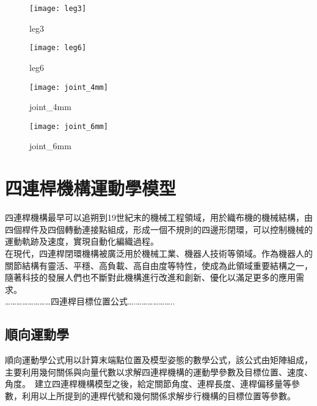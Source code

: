 \begin{figure}[htbp]
  \begin{minipage}[t]{0.45\linewidth}
    \centering
    \texttt{[image: leg3]}
    \caption{leg3}
    \label{leg3}
  \end{minipage}
  \hfill
  \begin{minipage}[t]{0.45\linewidth}
    \centering
    \texttt{[image: leg6]}
    \caption{leg6}
    \label{leg6}
  \end{minipage}
\end{figure}

\begin{figure}[htbp]
  \begin{minipage}[t]{0.45\linewidth}
    \centering
    \texttt{[image: joint\_4mm]}
    \caption{joint_4mm}
    \label{joint_4mm}
  \end{minipage}
  \hfill
  \begin{minipage}[t]{0.45\linewidth}
    \centering
    \texttt{[image: joint\_6mm]}
    \caption{joint_6mm}
    \label{joint_6mm}
  \end{minipage}
\end{figure}
\newpage

\section{四連桿機構運動學模型}

四連桿機構最早可以追朔到19世紀末的機械工程領域，用於織布機的機械結構，由四個桿件及四個轉動連接點組成，形成一個不規則的四邊形閉環，可以控制機械的運動軌跡及速度，實現自動化編織過程。\\
在現代，四連桿閉環機構被廣泛用於機械工業、機器人技術等領域。作為機器人的關節結構有靈活、平穩、高負載、高自由度等特性，使成為此領域重要結構之一，隨著科技的發展人們也不斷對此機構進行改進和創新、優化以滿足更多的應用需求。\\

……………………四連桿目標位置公式….………………..

\subsection{順向運動學}
順向運動學公式用以計算末端點位置及模型姿態的數學公式，該公式由矩陣組成，主要利用幾何關係與向量代數以求解四連桿機構的運動學參數及目標位置、速度、角度。\
建立四連桿機構模型之後，給定關節角度、連桿長度、連桿偏移量等參數，利用以上所提到的連桿代號和幾何關係求解步行機構的目標位置等參數。\\

